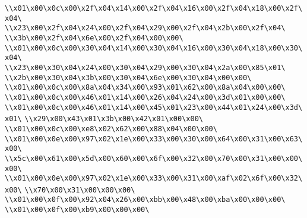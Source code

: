 \verb|\\x01\x00\x0c\x00\x2f\x04\x14\x00\x2f\x04\x16\x00\x2f\x04\x18\x00\x2f\x04\|\newline
\verb|\\x23\x00\x2f\x04\x24\x00\x2f\x04\x29\x00\x2f\x04\x2b\x00\x2f\x04\|\newline
\verb|\\x3b\x00\x2f\x04\x6e\x00\x2f\x04\x00\x00\|\newline
\verb|\\x01\x00\x0c\x00\x30\x04\x14\x00\x30\x04\x16\x00\x30\x04\x18\x00\x30\x04\|\newline
\verb|\\x23\x00\x30\x04\x24\x00\x30\x04\x29\x00\x30\x04\x2a\x00\x85\x01\|\newline
\verb|\\x2b\x00\x30\x04\x3b\x00\x30\x04\x6e\x00\x30\x04\x00\x00\|\newline
\verb|\\x01\x00\x0c\x00\x8a\x04\x34\x00\x93\x01\x62\x00\x8a\x04\x00\x00\|\newline
\verb|\\x01\x00\x0c\x00\x46\x01\x14\x00\x26\x04\x24\x00\x3d\x01\x00\x00\|\newline
\verb|\\x01\x00\x0c\x00\x46\x01\x14\x00\x45\x01\x23\x00\x44\x01\x24\x00\x3d\x01\|\newline
\verb|\\x29\x00\x43\x01\x3b\x00\x42\x01\x00\x00\|\newline
\verb|\\x01\x00\x0c\x00\xe8\x02\x62\x00\x88\x04\x00\x00\|\newline
\verb|\\x01\x00\x0e\x00\x97\x02\x1e\x00\x33\x00\x30\x00\x64\x00\x31\x00\x63\x00\|\newline
\verb|\\x5c\x00\x61\x00\x5d\x00\x60\x00\x6f\x00\x32\x00\x70\x00\x31\x00\x00\x00\|\newline
\verb|\\x01\x00\x0e\x00\x97\x02\x1e\x00\x33\x00\x31\x00\xaf\x02\x6f\x00\x32\x00\|\newline
\verb|\\x70\x00\x31\x00\x00\x00\|\newline
\verb|\\x01\x00\x0f\x00\x92\x04\x26\x00\xbb\x00\x48\x00\xba\x00\x00\x00\|\newline
\verb|\\x01\x00\x0f\x00\xb9\x00\x00\x00\|\newline

